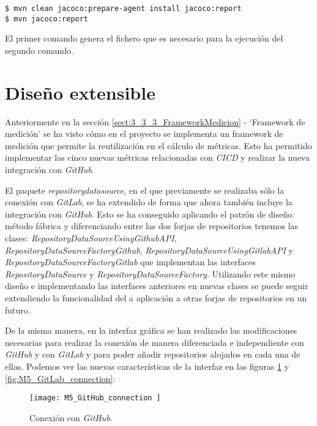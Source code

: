 \begin{minipage}{\linewidth}
{\tiny
\begin{verbatim}
$ mvn clean jacoco:prepare-agent install jacoco:report
$ mvn jacoco:report
\end{verbatim}
}
\end{minipage}

El primer comando genera el fichero  que es necesario para la ejecución del segundo comando.


\section{Diseño extensible}
Anteriormente en la sección \ref{sect:3_3_3_FrameworkMedicion} - `Framework de medición' se ha visto cómo en el proyecto se implementa un framework de medición que permite la reutilización en el cálculo de métricas. Esto ha permitido implementar las cinco nuevas métricas relacionadas con \textit{CICD} y realizar la nueva integración con \textit{GitHub}.

El paquete \textit{repositorydatasource}, en el que previamente se realizaba sólo la conexión con \textit{GitLab}, se ha extendido de forma que ahora también incluye la integración con \textit{GitHub}. Esto se ha conseguido aplicando el patrón de diseño: método fábrica y diferenciando entre las dos forjas de repositorios tenemos las clases: \textit{RepositoryDataSourceUsingGithubAPI}, \textit{RepositoryDataSourceFactoryGithub}, \textit{RepositoryDataSourceUsingGitlabAPI} y \textit{RepositoryDataSourceFactoryGitlab} que implementan las interfaces \textit{RepositoryDataSource} y \textit{RepositoryDataSourceFactory}. Utilizando este mismo diseño e implementando las interfaces anteriores en nuevas clases se puede seguir extendiendo la funcionalidad del a aplicación a otras forjas de repositorios en un futuro.

De la misma manera, en la interfaz gráfica se han realizado las modificaciones necesarias para realizar la conexión de manera diferenciada e independiente con \textit{GitHub} y con \textit{GitLab} y para poder añadir repositorios alojados en cada una de ellas. Podemos ver las nuevas características de la interfaz en las figuras \ref{fig:M5_GitHub_connection} y \ref{fig:M5_GitLab_connection}:

\begin{figure}[!h]
	\centering
	\texttt{[image: M5\_GitHub\_connection ]}
	\caption{Conexión con \textit{GitHub}.}\label{fig:M5_GitHub_connection}
\end{figure}
\FloatBarrier

